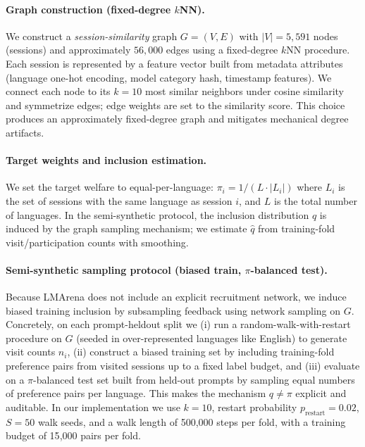 \documentclass{article}
\theoremstyle{plain}
\theoremstyle{definition}
\theoremstyle{remark}
\begin{document}
\paragraph{Graph construction (fixed-degree $k$NN).}
We construct a \emph{session-similarity} graph $G=(V,E)$ with
$|V|=5{,}591$ nodes (sessions) and approximately $56{,}000$ edges using a fixed-degree $k$NN procedure. Each session is
represented by a feature vector built from metadata attributes
(language one-hot encoding, model category hash, timestamp features).
We connect each node to its $k=10$ most similar neighbors under cosine similarity and
symmetrize edges; edge weights are set to the similarity score.
This choice produces an approximately fixed-degree graph and mitigates mechanical degree
artifacts.

\paragraph{Target weights and inclusion estimation.}
We set the target welfare to equal-per-language:
$\pi_i = 1 / (L \cdot |L_i|)$ where $L_i$ is the set of sessions with the same language
as session $i$, and $L$ is the total number of languages. In the semi-synthetic protocol,
the inclusion distribution $q$ is induced by the graph sampling mechanism; we estimate
$\hat q$ from training-fold visit/participation counts with smoothing.

\paragraph{Semi-synthetic sampling protocol (biased train, $\pi$-balanced test).}
Because LMArena does not include an explicit recruitment network, we induce biased
training inclusion by subsampling feedback using network sampling on $G$.
Concretely, on each prompt-heldout split we (i) run a random-walk-with-restart
procedure on $G$ (seeded in over-represented languages like English) to generate visit counts
$n_i$, (ii) construct a biased training set by including training-fold
preference pairs from visited sessions up to a fixed label budget, and (iii)
evaluate on a $\pi$-balanced test set built from held-out prompts by sampling
equal numbers of preference pairs per language. This makes the mechanism
$q\neq\pi$ explicit and auditable.
In our implementation we use $k=10$, restart probability $p_{\mathrm{restart}}=0.02$,
$S=50$ walk seeds, and a walk length of 500{,}000 steps per fold, with a
training budget of 15{,}000 pairs per fold.
\end{document}
